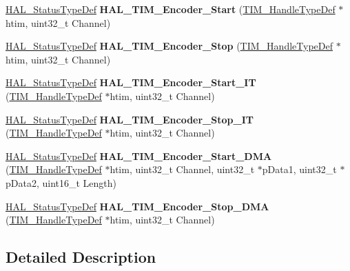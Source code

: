 \begin{DoxyCompactItemize}
\item 
\mbox{\label{group___t_i_m___exported___functions___group6_ga6450b21fa2bf6bf71a0f85c0a1519e21}} 
\hyperlink{stm32f1xx__hal__def_8h_a63c0679d1cb8b8c684fbb0632743478f}{H\+A\+L\+\_\+\+Status\+Type\+Def} {\bfseries H\+A\+L\+\_\+\+T\+I\+M\+\_\+\+Encoder\+\_\+\+Start} (\hyperlink{struct_t_i_m___handle_type_def}{T\+I\+M\+\_\+\+Handle\+Type\+Def} $\ast$htim, uint32\+\_\+t Channel)
\item 
\mbox{\label{group___t_i_m___exported___functions___group6_ga2d603e9167803b080be1f2915e972bbf}} 
\hyperlink{stm32f1xx__hal__def_8h_a63c0679d1cb8b8c684fbb0632743478f}{H\+A\+L\+\_\+\+Status\+Type\+Def} {\bfseries H\+A\+L\+\_\+\+T\+I\+M\+\_\+\+Encoder\+\_\+\+Stop} (\hyperlink{struct_t_i_m___handle_type_def}{T\+I\+M\+\_\+\+Handle\+Type\+Def} $\ast$htim, uint32\+\_\+t Channel)
\item 
\mbox{\label{group___t_i_m___exported___functions___group6_ga9a573a3203752709841acab8412f541e}} 
\hyperlink{stm32f1xx__hal__def_8h_a63c0679d1cb8b8c684fbb0632743478f}{H\+A\+L\+\_\+\+Status\+Type\+Def} {\bfseries H\+A\+L\+\_\+\+T\+I\+M\+\_\+\+Encoder\+\_\+\+Start\+\_\+\+IT} (\hyperlink{struct_t_i_m___handle_type_def}{T\+I\+M\+\_\+\+Handle\+Type\+Def} $\ast$htim, uint32\+\_\+t Channel)
\item 
\mbox{\label{group___t_i_m___exported___functions___group6_gac07923b4764255a1e0b82c975689542d}} 
\hyperlink{stm32f1xx__hal__def_8h_a63c0679d1cb8b8c684fbb0632743478f}{H\+A\+L\+\_\+\+Status\+Type\+Def} {\bfseries H\+A\+L\+\_\+\+T\+I\+M\+\_\+\+Encoder\+\_\+\+Stop\+\_\+\+IT} (\hyperlink{struct_t_i_m___handle_type_def}{T\+I\+M\+\_\+\+Handle\+Type\+Def} $\ast$htim, uint32\+\_\+t Channel)
\item 
\mbox{\label{group___t_i_m___exported___functions___group6_ga8b9798534ad0917d31d581afe720d8cf}} 
\hyperlink{stm32f1xx__hal__def_8h_a63c0679d1cb8b8c684fbb0632743478f}{H\+A\+L\+\_\+\+Status\+Type\+Def} {\bfseries H\+A\+L\+\_\+\+T\+I\+M\+\_\+\+Encoder\+\_\+\+Start\+\_\+\+D\+MA} (\hyperlink{struct_t_i_m___handle_type_def}{T\+I\+M\+\_\+\+Handle\+Type\+Def} $\ast$htim, uint32\+\_\+t Channel, uint32\+\_\+t $\ast$p\+Data1, uint32\+\_\+t $\ast$p\+Data2, uint16\+\_\+t Length)
\item 
\mbox{\label{group___t_i_m___exported___functions___group6_ga12ea48505e269532feff5b64f605b56f}} 
\hyperlink{stm32f1xx__hal__def_8h_a63c0679d1cb8b8c684fbb0632743478f}{H\+A\+L\+\_\+\+Status\+Type\+Def} {\bfseries H\+A\+L\+\_\+\+T\+I\+M\+\_\+\+Encoder\+\_\+\+Stop\+\_\+\+D\+MA} (\hyperlink{struct_t_i_m___handle_type_def}{T\+I\+M\+\_\+\+Handle\+Type\+Def} $\ast$htim, uint32\+\_\+t Channel)
\end{DoxyCompactItemize}


\subsection{Detailed Description}

